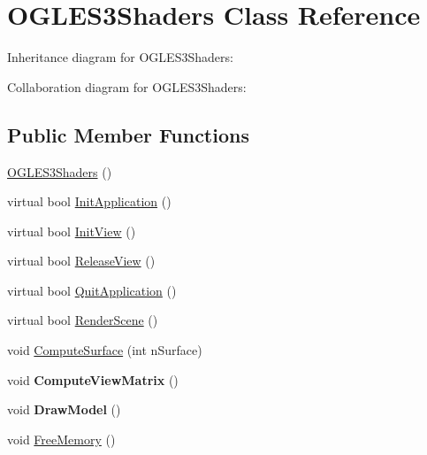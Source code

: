 \hypertarget{class_o_g_l_e_s3_shaders}{\section{O\+G\+L\+E\+S3\+Shaders Class Reference}
\label{class_o_g_l_e_s3_shaders}
}


Inheritance diagram for O\+G\+L\+E\+S3\+Shaders\+:


Collaboration diagram for O\+G\+L\+E\+S3\+Shaders\+:
\subsection*{Public Member Functions}
\begin{DoxyCompactItemize}
\item 
\hyperlink{class_o_g_l_e_s3_shaders_a2c50d091ab40f80e9d5bee6ea0382ed1}{O\+G\+L\+E\+S3\+Shaders} ()
\item 
virtual bool \hyperlink{class_o_g_l_e_s3_shaders_aefcce5d089f62dd32984a976548b02ab}{Init\+Application} ()
\item 
virtual bool \hyperlink{class_o_g_l_e_s3_shaders_abbeeffa11a404097b6d1d0bd86acbf3d}{Init\+View} ()
\item 
virtual bool \hyperlink{class_o_g_l_e_s3_shaders_a0861f258afaf7cef4b4395d7ba6a9c8b}{Release\+View} ()
\item 
virtual bool \hyperlink{class_o_g_l_e_s3_shaders_a64ba12f200109d8885f3a4ab0c39e0ce}{Quit\+Application} ()
\item 
virtual bool \hyperlink{class_o_g_l_e_s3_shaders_aaf7cbc1b86525690d332eff52b10d2d3}{Render\+Scene} ()
\item 
void \hyperlink{class_o_g_l_e_s3_shaders_a89d807041427eaee3053b074c9e471ee}{Compute\+Surface} (int n\+Surface)
\item 
\hypertarget{class_o_g_l_e_s3_shaders_ad9c1d1966f621305fa32129743617bbb}{void {\bfseries Compute\+View\+Matrix} ()}\label{class_o_g_l_e_s3_shaders_ad9c1d1966f621305fa32129743617bbb}

\item 
\hypertarget{class_o_g_l_e_s3_shaders_af585fc965b36d9d5d0e8247e85207153}{void {\bfseries Draw\+Model} ()}\label{class_o_g_l_e_s3_shaders_af585fc965b36d9d5d0e8247e85207153}

\item 
void \hyperlink{class_o_g_l_e_s3_shaders_a46979dd5a8dc92aa380b0adb71a1f902}{Free\+Memory} ()
\end{DoxyCompactItemize}


